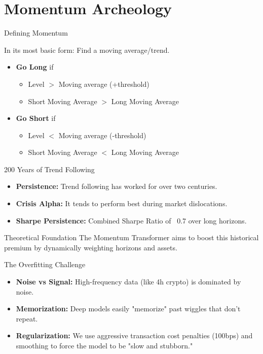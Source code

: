 
\section{Momentum Archeology}

\begin{frame}{Defining Momentum}
    \begin{definition}
    In its most basic form: Find a moving average/trend.
        \begin{itemize}
        \item \textbf{Go Long} if 
            \begin{itemize}
            \item Level $>$ Moving average (+threshold)
            \item Short Moving Average $>$ Long Moving Average
            \end{itemize}
        \item \textbf{Go Short} if
            \begin{itemize}
            \item Level $<$ Moving average (-threshold)
            \item Short Moving Average $<$ Long Moving Average
            \end{itemize}
        \end{itemize}
    \end{definition}
\end{frame}

\begin{frame}{200 Years of Trend Following}
    \begin{itemize}
        \item \textbf{Persistence:} Trend following has worked for over two centuries.
        \item \textbf{Crisis Alpha:} It tends to perform best during market dislocations.
        \item \textbf{Sharpe Persistence:} Combined Sharpe Ratio of ~0.7 over long horizons.
    \end{itemize}
    \begin{block}{Theoretical Foundation}
        The Momentum Transformer aims to boost this historical premium by dynamically weighting horizons and assets.
    \end{block}
\end{frame}

\begin{frame}{The Overfitting Challenge}
    \begin{itemize}
        \item \textbf{Noise vs Signal:} High-frequency data (like 4h crypto) is dominated by noise.
        \item \textbf{Memorization:} Deep models easily "memorize" past wiggles that don't repeat.
        \item \textbf{Regularization:} We use aggressive transaction cost penalties (100bps) and smoothing to force the model to be "slow and stubborn."
    \end{itemize}
\end{frame}

